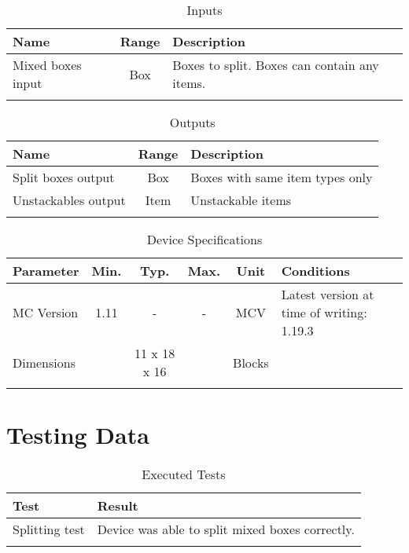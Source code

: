 \documentclass[10pt]{datasheet}
\begin{document}
\begin{table}[h]
    \caption{Inputs}
    \begin{tabularx}{\textwidth}{l | c | X}
        \thickhline
        \textbf{Name} & \textbf{Range} & \textbf{Description} \\
        \hline
        Mixed boxes input & Box & Boxes to split. Boxes can contain any items. \\
        \thickhline
\end{tabularx}
\end{table}

\begin{table}[h]
    \caption{Outputs}
    \begin{tabularx}{\textwidth}{l | c | X}
        \thickhline
        \textbf{Name} & \textbf{Range} & \textbf{Description} \\
        \hline
        Split boxes output & Box & Boxes with same item types only \\
        \hline
        Unstackables output & Item & Unstackable items \\
        \thickhline
\end{tabularx}
\end{table}

\begin{table}[h]
    \caption{Device Specifications}
    \begin{tabularx}{\textwidth}{l | c c c | c | X}
        \thickhline
        \textbf{Parameter} & \textbf{Min.} & \textbf{Typ.} & \textbf{Max.} &
        \textbf{Unit} & \textbf{Conditions} \\
        \hline
        MC Version & 1.11 & - & - & MCV & Latest version at time of writing: 1.19.3\\
        \hline
        Dimensions & & 11 x 18 x 16 & & Blocks & \\
        \thickhline
\end{tabularx}
\end{table}

\newpage
\section{Testing Data}
\begin{table}[h]
    \caption{Executed Tests}
    \begin{tabularx}{\textwidth}{l | X}
        \thickhline
        \textbf{Test} & \textbf{Result} \\
        \hline
        Splitting test & Device was able to split mixed boxes correctly. \\
        \thickhline
\end{tabularx}
\end{table}
\end{document}
